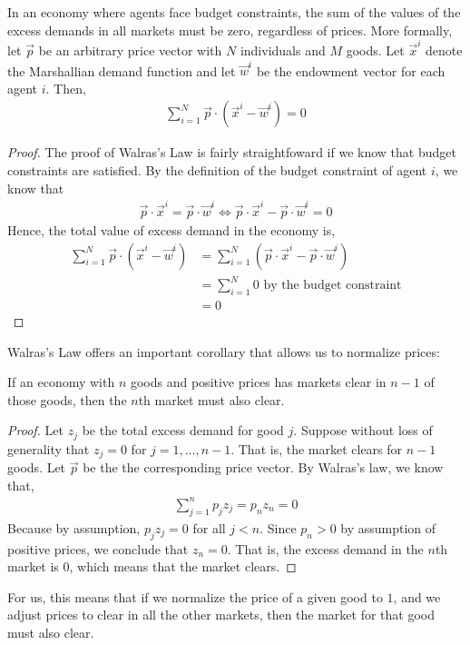 \begin{theorem*}
    In an economy where agents face budget constraints, the sum of the values of the excess demands in all markets must be zero, regardless of prices. More formally, let $\vec{p}$ be an arbitrary price vector with $N$ individuals and $M$ goods. Let $\vec{x}^i$ denote the Marshallian demand function and let $\vec{w}^i$ be the endowment vector for each agent $i$. Then,
    \begin{align*}
        \sum_{i = 1}^N \vec{p} \cdot (\vec{x}^i - \vec{w}^i) = 0
    \end{align*}
\end{theorem*}
\begin{proof}
    The proof of Walras's Law is fairly straightfoward if we know that budget constraints are satisfied. By the definition of the budget constraint of agent $i$, we know that
    \begin{align*}
        \vec{p} \cdot \vec{x}^i = \vec{p} \cdot \vec{w}^i \iff  \vec{p} \cdot \vec{x}^i - \vec{p} \cdot \vec{w}^i = 0 
    \end{align*}
    Hence, the total value of excess demand in the economy is,
    \begin{align*}
        \sum_{i = 1}^N \vec{p} \cdot (\vec{x}^i - \vec{w}^i) &= \sum_{i = 1}^N  (\vec{p} \cdot \vec{x}^i - \vec{p} \cdot \vec{w}^i) \\
        &= \sum_{i = 1}^N 0 \text{ by the budget constraint}\\
        &= 0 
    \end{align*}
\end{proof}

Walras's Law offers an important corollary that allows us to normalize prices:
\begin{corollary*}
    If an economy with $n$ goods and positive prices has markets clear in $n - 1$ of those goods, then the $n$th market must also clear.
\end{corollary*}

\begin{proof}
    Let $z_j$ be the total excess demand for good $j$. Suppose without loss of generality that $z_j = 0$ for $j = 1, \dots, n - 1$. That is, the market clears for $n - 1$ goods. Let $\vec{p}$ be the the corresponding price vector. By Walras's law, we know that, 
    \begin{align*}
        \sum_{j = 1}^n p_j z_j = p_n z_n = 0
    \end{align*}
    Because by assumption, $p_j z_j = 0$ for all $j < n$. Since $p_n > 0$ by assumption of positive prices, we conclude that $z_n = 0$. That is, the excess demand in the $n$th market is 0, which means that the market clears. 
\end{proof}
For us, this means that if we normalize the price of a given good to $1$, and we adjust prices to clear in all the other markets, then the market for that good must also clear. 

